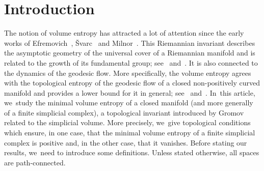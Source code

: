 \section{Introduction}

The notion of volume entropy has attracted a lot of attention since the early works of Efremovich~\cite{Efrem53}, \v{S}varc~\cite{Shvarts55} and Milnor~\cite{Milnor68}.
This Riemannian invariant describes the asymptotic geometry of the universal cover of a Riemannian manifold and is related to the growth of its fundamental group; see~\cite{Shvarts55} and~\cite{Milnor68}.
It is also connected to the dynamics of the geodesic flow.
More specifically, the volume entropy agrees with the topological entropy of the geodesic flow of a closed non-positively curved manifold and provides a lower bound for it in general; see~\cite{Dinaburg71} and~\cite{Manning79}. In~this article, we~study the minimal volume entropy of a closed manifold (and more generally of a finite simplicial complex), a topological invariant introduced by Gromov~\cite{gro82} related to the simplicial volume.
More precisely, we~give topological conditions which ensure, in one case, that the minimal volume entropy of a finite simplicial complex is positive and, in the other case, that it vanishes.
Before stating our results, we~need to introduce some definitions.
Unless stated otherwise, all spaces are path-connected.

